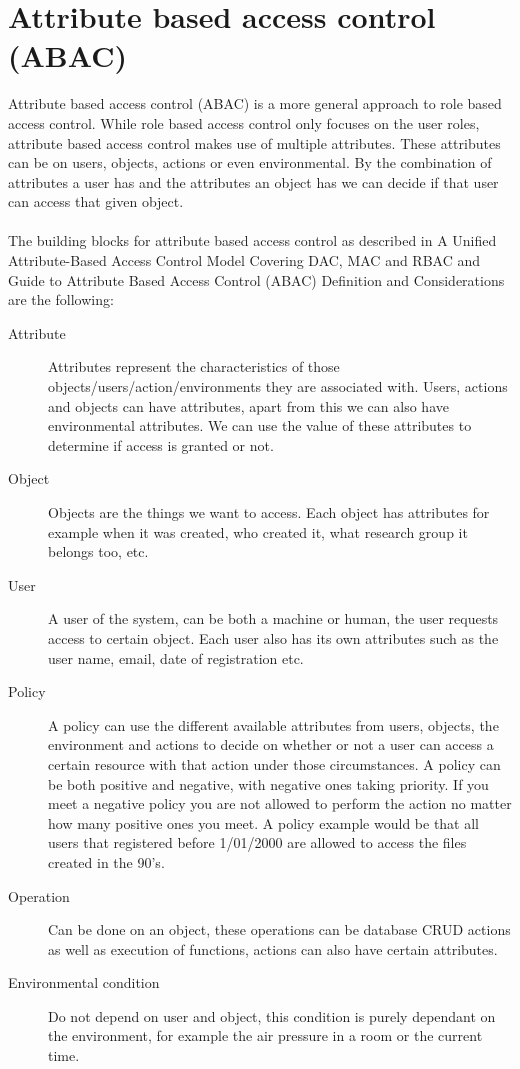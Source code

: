 \section{Attribute based access control (ABAC)}
 Attribute based access control (ABAC) is a more general approach to role based access control. 
 While role based access control only focuses on the user roles, attribute based access control makes use of multiple attributes.
 These attributes can be on users, objects, actions or even environmental.
 By the combination of attributes a user has and the attributes an object has we can decide if that user can access that given object.  
\\
\\
The building blocks for attribute based access control as described in A Unified Attribute-Based Access Control
Model Covering DAC, MAC and RBAC\cite{ABAC2} and Guide to Attribute Based Access Control (ABAC) Definition and Considerations\cite{ABAC} are the following:
\begin{description}
    \item [Attribute]Attributes represent the characteristics of those objects/users/action/environments they are associated with.
    Users, actions and objects can have attributes, apart from this we can also have environmental attributes.
    We can use the value of these attributes to determine if access is granted or not.
    \item [Object] Objects are the things we want to access. Each object has attributes for example when it was created, who created it, what research group it belongs too, etc. 
    \item [User] A user of the system, can be both a machine or human, the user requests access to certain object. Each user also has its own attributes such as the user name, email, date of registration etc.
    \item [Policy] A policy can use the different available attributes from users, objects, the environment and actions to decide on whether or not a user can access a certain resource with that action under those circumstances.
    A policy can be both positive and negative, with negative ones taking priority.
    If you meet a negative policy you are not allowed to perform the action no matter how many positive ones you meet.
    A policy example would be that all users that registered before 1/01/2000 are allowed to access the files created in the 90's.
    \item [Operation] Can be done on an object, these operations can be database CRUD actions as well as execution of functions, actions can also have certain attributes.
    \item [Environmental condition] Do not depend on user and object, this condition is purely dependant on the environment, for example the air pressure in a room or the current time.
\end{description}
